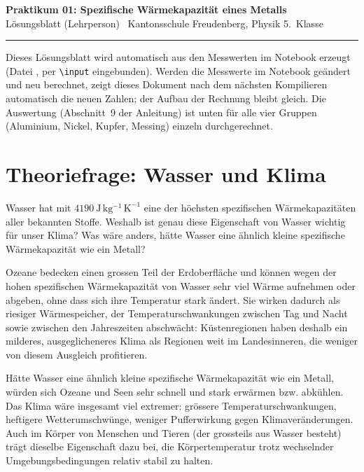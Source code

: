 \documentclass[11pt,a4paper]{article}
\begin{document}
\thispagestyle{empty}

\begin{center}
  {\color{kfrblue}\Large\bfseries Praktikum 01: Spezifische W\"armekapazit\"at eines Metalls}\\[2pt]
  {\normalsize Lösungsblatt (Lehrperson) \textbar\ Kantonsschule Freudenberg, Physik 5.\ Klasse}
\end{center}

\vspace{8pt}
\hrule
\vspace{10pt}

\noindent
Dieses Lösungsblatt wird automatisch aus den Messwerten im Notebook  erzeugt (Datei , per \texttt{\textbackslash input} eingebunden). Werden die Messwerte im Notebook geändert und neu berechnet, zeigt dieses Dokument nach dem nächsten Kompilieren automatisch die neuen Zahlen; der Aufbau der Rechnung bleibt gleich. Die Auswertung (Abschnitt~9 der Anleitung) ist unten für alle vier Gruppen (Aluminium, Nickel, Kupfer, Messing) einzeln durchgerechnet.

\vspace{6pt}
\section{Theoriefrage: Wasser und Klima}
\begin{aufgabebox}
Wasser hat mit $\mathrm{4190\ J\,kg^{-1}\,K^{-1}}$ eine der höchsten spezifischen Wärmekapazitäten aller bekannten Stoffe. Weshalb ist genau diese Eigenschaft von Wasser wichtig für unser Klima? Was wäre anders, hätte Wasser eine ähnlich kleine spezifische Wärmekapazität wie ein Metall?
\end{aufgabebox}
\begin{loesungbox}
Ozeane bedecken einen grossen Teil der Erdoberfläche und können wegen der hohen spezifischen Wärmekapazität von Wasser sehr viel Wärme aufnehmen oder abgeben, ohne dass sich ihre Temperatur stark ändert. Sie wirken dadurch als riesiger Wärmespeicher, der Temperaturschwankungen zwischen Tag und Nacht sowie zwischen den Jahreszeiten abschwächt: Küstenregionen haben deshalb ein milderes, ausgeglicheneres Klima als Regionen weit im Landesinneren, die weniger von diesem Ausgleich profitieren.

Hätte Wasser eine ähnlich kleine spezifische Wärmekapazität wie ein Metall, würden sich Ozeane und Seen sehr schnell und stark erwärmen bzw. abkühlen. Das Klima wäre insgesamt viel extremer: grössere Temperaturschwankungen, heftigere Wetterumschwünge, weniger Pufferwirkung gegen Klimaveränderungen. Auch im Körper von Menschen und Tieren (der grossteils aus Wasser besteht) trägt dieselbe Eigenschaft dazu bei, die Körpertemperatur trotz wechselnder Umgebungsbedingungen relativ stabil zu halten.
\end{loesungbox}
\end{document}
